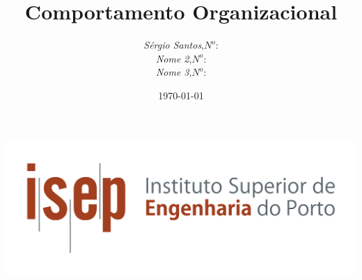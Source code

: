 \begin{titlepage}
\begin{minipage}{0.95\linewidth}
\centering
\includegraphics[scale=0.60]{./image/capa/ISEP_marca_cor_grande.png}
\label{Capa}
\title{Comportamento Organizacional}
\author{
\emph{S\'{e}rgio Santos},\;$N^o$: \\
\emph{Nome 2},\;$N^o$:\\
\emph{Nome 3},\;$N^o$:\\
}
\date{\today}
\maketitle
\end{minipage}
\end{titlepage}